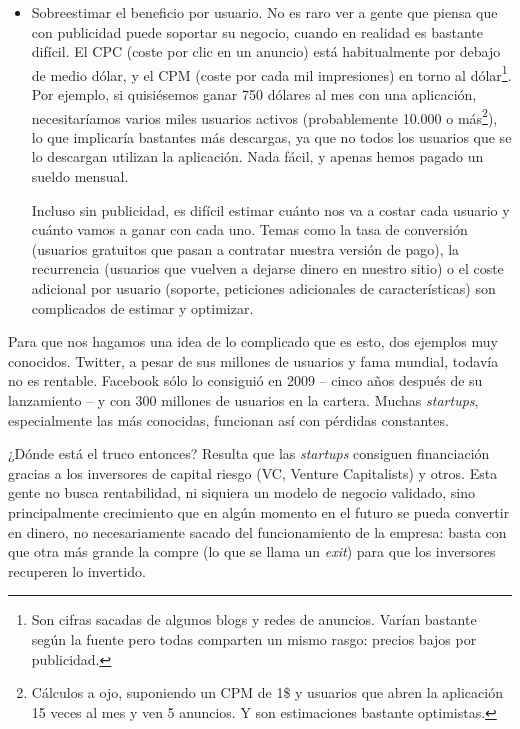 \documentclass[nochap,palatino,shortheader]{apuntes}
\newcommand{\study}[1]{#1} \newcommand{\substudy}[1]{#1}
\begin{document}
\begin{itemize}
\item \study{Sobreestimar el beneficio por usuario}. No es raro ver a gente que piensa que con publicidad puede soportar su negocio, cuando en realidad es bastante difícil. El CPC (coste por clic en un anuncio) está habitualmente por debajo de medio dólar, y el CPM (coste por cada mil impresiones) en torno al dólar\footnote{Son cifras sacadas de algunos blogs y redes de anuncios. Varían bastante según la fuente pero todas comparten un mismo rasgo: precios bajos por publicidad.}.
Por ejemplo, si quisiésemos ganar 750 dólares al mes con una aplicación, necesitaríamos varios miles usuarios activos (probablemente 10.000 o más\footnote{Cálculos a ojo, suponiendo un CPM de 1\$ y usuarios que abren la aplicación 15 veces al mes y ven 5 anuncios. Y son estimaciones bastante optimistas.}), lo que implicaría bastantes más descargas, ya que no todos los usuarios que se lo descargan utilizan la aplicación. Nada fácil, y apenas hemos pagado un sueldo mensual.

Incluso sin publicidad, es difícil estimar cuánto nos va a costar cada usuario y cuánto vamos a ganar con cada uno. Temas como la tasa de conversión (usuarios gratuitos que pasan a contratar nuestra versión de pago), la recurrencia (usuarios que vuelven a dejarse dinero en nuestro sitio) o el coste adicional por usuario (soporte, peticiones adicionales de características) son complicados de estimar y optimizar.
\end{itemize}

Para que nos hagamos una idea de lo complicado que es esto, dos ejemplos muy conocidos.
\substudy{Twitter}, a pesar de sus millones de usuarios y fama mundial, \substudy{todavía no es rentable}. Facebook sólo lo consiguió en 2009 -- cinco años después de su lanzamiento -- y con 300 millones de usuarios en la cartera.
Muchas \textit{startups}, especialmente las más conocidas, funcionan así con pérdidas constantes.

\substudy{¿Dónde está el truco entonces?} Resulta que las \textit{startups} consiguen financiación gracias a los \substudy{inversores} de capital riesgo (VC, Venture Capitalists) y otros.
Esta gente no busca rentabilidad, ni siquiera un modelo de negocio validado, sino principalmente crecimiento que en algún momento en el futuro se pueda convertir en dinero, no necesariamente sacado del funcionamiento de la empresa: basta con que otra más grande la compre (lo que se llama un \textit{exit}) para que los inversores recuperen lo invertido.
\end{document}
